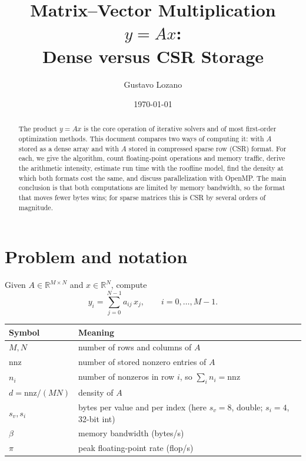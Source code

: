 \documentclass[11pt,a4paper]{article}
\title{Matrix--Vector Multiplication $y = Ax$:\\ Dense versus CSR Storage}
\author{Gustavo Lozano}
\date{\today}
\newcommand{\nnz}{\mathrm{nnz}}
\begin{document}
\maketitle

\begin{abstract}
The product $y = Ax$ is the core operation of iterative solvers and of most
first-order optimization methods. This document compares two ways of
computing it: with $A$ stored as a dense array and with $A$ stored in
compressed sparse row (CSR) format. For each, we give the algorithm, count
floating-point operations and memory traffic, derive the arithmetic intensity,
estimate run time with the roofline model, find the density at which both
formats cost the same, and discuss parallelization with OpenMP. The main
conclusion is that both computations are limited by memory bandwidth, so the
format that moves fewer bytes wins; for sparse matrices this is CSR by several
orders of magnitude.
\end{abstract}

\tableofcontents

\section{Problem and notation}

Given $A \in \mathbb{R}^{M \times N}$ and $x \in \mathbb{R}^{N}$, compute
\[
  y_i = \sum_{j=0}^{N-1} a_{ij}\, x_j, \qquad i = 0, \dots, M-1 .
\]

\begin{center}
\begin{tabular}{ll}
\toprule
Symbol & Meaning \\
\midrule
$M, N$ & number of rows and columns of $A$ \\
$\nnz$ & number of stored nonzero entries of $A$ \\
$n_i$ & number of nonzeros in row $i$, so $\sum_i n_i = \nnz$ \\
$d = \nnz / (MN)$ & density of $A$ \\
$s_v, s_i$ & bytes per value and per index (here $s_v = 8$, double; $s_i = 4$, 32-bit int) \\
$\beta$ & memory bandwidth (bytes/s) \\
$\pi$ & peak floating-point rate (flop/s) \\
\bottomrule
\end{tabular}
\end{center}
\end{document}
